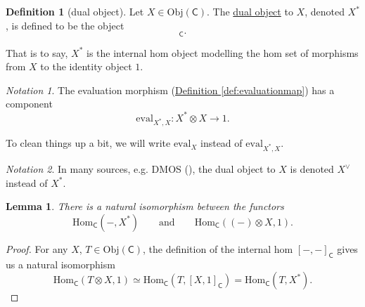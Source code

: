 \documentclass[a4paper]{report}
\newcommand{\defn}[1]{\ul{#1}}
\newcommand{\Obj}{\mathrm{Obj}}
\newcommand{\Hom}{\mathrm{Hom}}
\newcommand{\ev}{\mathrm{eval}}
\theoremstyle{definition}
\newtheorem{definition}{Definition}[section]
\theoremstyle{plain}
\newtheorem{lemma}{Lemma}[section]
\theoremstyle{remark}
\newtheorem{notation}{Notation}[section]
\begin{document}
\begin{definition}[dual object]
  \label{def:dualobject}
  Let $X \in \Obj(\mathsf{C})$. The \defn{dual object} to $X$, denoted $X^{*}$, is defined to be the object
  \begin{equation*}
    [X, 1]_{\mathsf{C}}.
  \end{equation*}

  That is to say, $X^{*}$ is the internal hom object modelling the hom set of morphisms from $X$ to the identity object $1$.
\end{definition}

\begin{notation}
  The evaluation morphism (\hyperref[def:evaluationmap]{Definition \ref*{def:evaluationmap}}) has a component
  \begin{equation*}
    \ev_{X^{*}, X}\colon X^{*} \otimes X \to 1.
  \end{equation*}

  To clean things up a bit, we will write $\ev_{X}$ instead of $\ev_{X^{*}, X}$.
\end{notation}

\begin{notation}
  In many sources, e.g. DMOS (\cite{DMOS}), the dual object to $X$ is denoted $X^{\vee}$ instead of $X^{*}$.
\end{notation}

\begin{lemma}
  There is a natural isomorphism between the functors
  \begin{equation*}
    \Hom_{\mathsf{C}}(-, X^{*})\qquad\text{and}\qquad \Hom_{\mathsf{C}}((-) \otimes X, 1).
  \end{equation*}
\end{lemma}
\begin{proof}
  For any $X$, $T \in \Obj(\mathsf{C})$, the definition of the internal hom $[-,-]_{\mathsf{C}}$ gives us a natural isomorphism
  \begin{equation*}
    \Hom_{\mathsf{C}}(T \otimes X, 1) \simeq \Hom_{\mathsf{C}}(T, [X, 1]_{\mathsf{C}}) = \Hom_{\mathsf{C}}(T, X^{*}).
  \end{equation*}
\end{proof}
\end{document}

